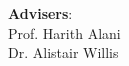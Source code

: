 \begin{titlepage}
\begin{center}


        \textbf{Advisers}:\\
        Prof. Harith Alani\\
        Dr. Alistair Willis
            
            
        
        
        
        
        
        \vspace{1.5cm}
            
        \large
        \thedate
            
    \end{center}
\end{titlepage}